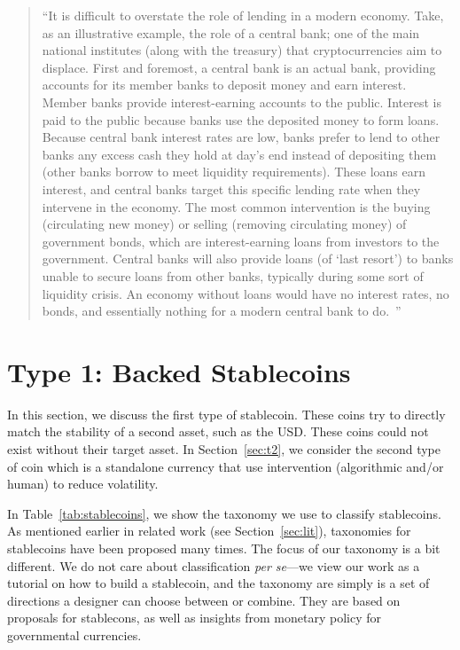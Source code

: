 \begin{quote}

``It is difficult to overstate the role of lending in a modern economy. Take, as an illustrative example, the role of a central bank; one of the main national institutes (along with the treasury) that cryptocurrencies aim to displace. First and foremost, a central bank is an actual bank, providing accounts for its member banks to deposit money and earn interest. Member banks provide interest-earning accounts to the public. Interest is paid to the public because banks use the deposited money to form loans. Because central bank interest rates are low, banks prefer to lend to other banks any excess cash they hold at day's end instead of depositing them (other banks borrow to meet liquidity requirements). These loans earn interest, and central banks target this specific lending rate when they intervene in the economy. The most common intervention is the buying (circulating new money) or selling (removing circulating money) of government bonds, which are interest-earning loans from investors to the government. Central banks will also provide loans (of `last resort') to banks unable to secure loans from other banks, typically during some sort of liquidity crisis. An economy without loans would have no interest rates, no bonds, and essentially nothing for a modern central bank to do.~\cite{okoyetoward}''

\end{quote}



\section{Type 1: Backed Stablecoins}
\label{sec:t1}

In this section, we discuss the first type of stablecoin. These coins try to directly match the stability of a second asset, such as the USD. These coins could not exist without their target asset. In Section~\ref{sec:t2}, we consider the second type of coin which is a standalone currency that use intervention (algorithmic and/or human) to reduce volatility.



In Table~\ref{tab:stablecoins}, we show the taxonomy we use to classify stablecoins. As mentioned earlier in related work (see Section~\ref{sec:lit}), taxonomies for stablecoins have been proposed many times. The focus of our taxonomy is a bit different. We do not care about classification \textit{per se}---we view our work as a tutorial on how to build a stablecoin, and the taxonomy are simply is a set of directions a designer can choose between or combine. They are based on proposals for stablecons, as well as insights from monetary policy for governmental currencies.

